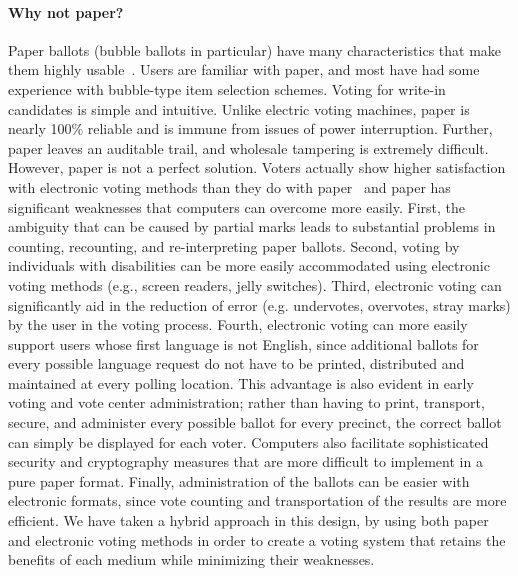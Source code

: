 \paragraph{Why not paper?}
Paper ballots (bubble ballots in particular) have many characteristics that make them highly usable~\cite{hfes-06,byrne-baseline}. 
Users are familiar with paper, and most have had some experience with bubble-type item selection schemes. Voting for write-in candidates is simple and intuitive. 
Unlike electric voting machines, paper is nearly 100\% reliable and is immune from issues of power interruption. Further, paper leaves an auditable trail, and wholesale tampering is extremely difficult. 
However, paper is not a perfect solution. 
Voters actually show higher satisfaction with electronic voting methods than they do with paper~\cite{everett08chi-dre-usability} and paper has significant weaknesses that computers 
can overcome more easily. 
First, the ambiguity that can be caused by partial marks leads to substantial problems in counting, recounting, and re-interpreting paper ballots.
Second, voting by individuals with disabilities can be more easily accommodated using electronic voting methods (e.g., screen readers, jelly switches).
Third, electronic voting can significantly aid in the reduction of error (e.g. undervotes, overvotes, stray marks) by the user in the voting process.
Fourth, electronic voting can more easily support users whose first language is not English, since additional ballots for every possible language request do not have to be printed, distributed and maintained at every polling location. 
This advantage is also evident in early voting and vote center administration; rather than having to print, transport, secure, and administer every possible ballot for every precinct, the correct ballot can simply be displayed for each voter. 
Computers also facilitate sophisticated security and cryptography measures 
that are more difficult to implement in a pure paper format.
Finally, administration of the ballots can be easier with electronic formats, since vote counting and transportation of the results are more efficient.
We have taken a hybrid approach in this design, by using both paper and electronic voting methods in order to create a voting system that retains the benefits of each medium while minimizing their weaknesses. 
